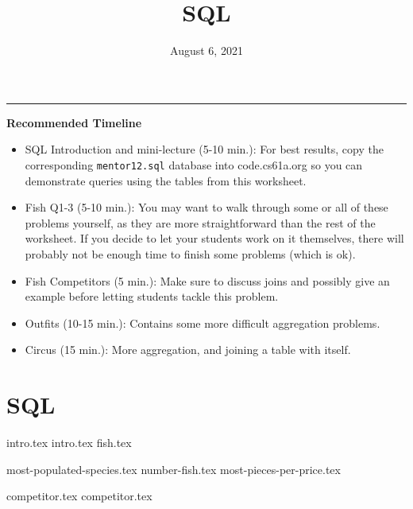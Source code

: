 \documentclass{exam}
\title{\textsc{SQL}}
\date{August 6, 2021}
\begin{document}
\maketitle\rule{\textwidth}{0.15em}
\fontsize{12}{15}\selectfont

\begin{blocksection}
\begin{guide}
\textbf{Recommended Timeline}
\begin{itemize}
  \item SQL Introduction and mini-lecture (5-10 min.): For best results, copy the corresponding \texttt{mentor12.sql} database into code.cs61a.org so you can demonstrate queries using the tables from this worksheet.
  \item Fish Q1-3 (5-10 min.): You may want to walk through some or all of 
  these problems yourself, as they are more straightforward than the rest of
  the worksheet. If you decide to let your students work on it themselves, there will
  probably not be enough time to finish some problems (which is ok).
  \item Fish Competitors (5 min.): Make sure to discuss joins and possibly give an example
  before letting students tackle this problem.
  \item Outfits (10-15 min.): Contains some more difficult aggregation problems.
  \item Circus (15 min.): More aggregation, and joining a table with itself.
\end{itemize}
\end{guide}
\end{blocksection}


\section{SQL}
{intro.tex}
\newpage
{intro.tex}
{fish.tex}

\begin{questions}
  {most-populated-species.tex}
  {number-fish.tex}
  {most-pieces-per-price.tex}
\end{questions}
\newpage
{competitor.tex}
{competitor.tex}
\end{document}
